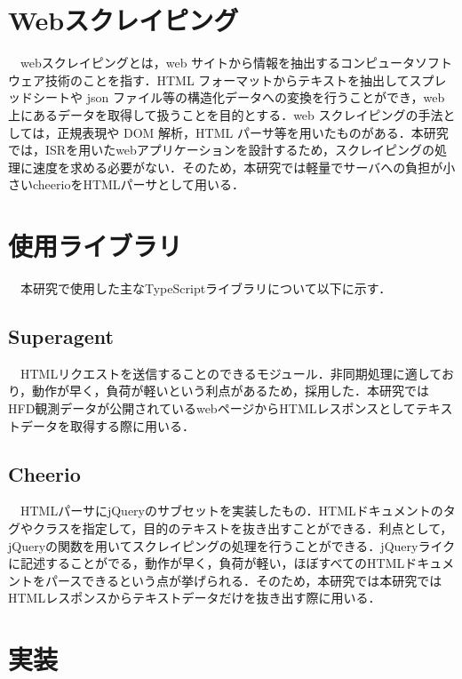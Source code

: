 \section{Webスクレイピング}

　webスクレイピングとは，web サイトから情報を抽出するコンピュータソフトウェア技術のことを指す．HTML フォーマットからテキストを抽出してスプレッドシートや json ファイル等の構造化データへの変換を行うことができ，web 上にあるデータを取得して扱うことを目的とする．web スクレイピングの手法としては，正規表現や DOM 解析，HTML パーサ等を用いたものがある．本研究では，ISRを用いたwebアプリケーションを設計するため，スクレイピングの処理に速度を求める必要がない．そのため，本研究では軽量でサーバへの負担が小さいcheerioをHTMLパーサとして用いる．
\section{使用ライブラリ}
　本研究で使用した主なTypeScriptライブラリについて以下に示す．
\subsection{Superagent}

　HTMLリクエストを送信することのできるモジュール．非同期処理に適しており，動作が早く，負荷が軽いという利点があるため，採用した．本研究ではHFD観測データが公開されているwebページからHTMLレスポンスとしてテキストデータを取得する際に用いる．\cite{superagent}
\subsection{Cheerio}

　HTMLパーサにjQueryのサブセットを実装したもの．HTMLドキュメントのタグやクラスを指定して，目的のテキストを抜き出すことができる．利点として，jQueryの関数を用いてスクレイピングの処理を行うことができる．jQueryライクに記述することがでる，動作が早く，負荷が軽い，ほぼすべてのHTMLドキュメントをパースできるという点が挙げられる．そのため，本研究では本研究ではHTMLレスポンスからテキストデータだけを抜き出す際に用いる．\cite{cheerio}
\section{実装}
